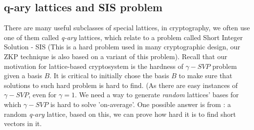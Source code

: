 \subsection{q-ary lattices and SIS problem}
\label{sub:q-ary lattices and SIS problem}
There are many useful subclasses of special lattices, in cryptography, we often
use one of them called \emph{q-ary} lattices, which relate to a problem called
Short Integer Solution - SIS (This is a hard problem used in many cryptographic
design, our ZKP technique is also based on a variant of this problem). Recall
that our motivation for lattice-based cryptosystem is the hardness of
$\gamma-SVP$ problem given a basis $B$. It is critical to initially chose the
basis $B$ to make sure that solutions to such hard problem is hard to find. (As
there are easy instances of $\gamma-SVP$, even for $\gamma=1$. We need a way to
generate \emph{random} lattices' bases for which $\gamma-SVP$ is hard to solve
'on-average'. One possible answer is from \cite{ajtai1996generating}: a random
\emph{q-ary} lattice, based on this, we can prove how hard it is to find short
vectors in it.


